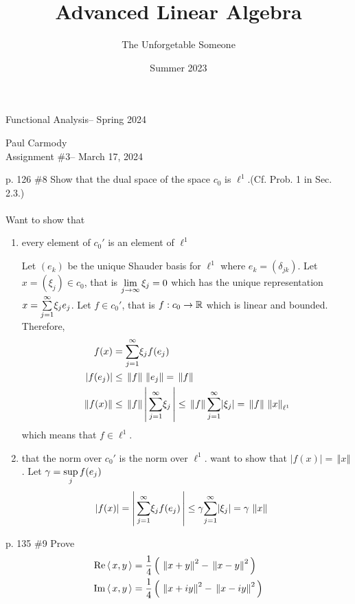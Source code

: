 \documentclass[10pt,a4paper]{report}
\title{Advanced Linear Algebra}
\author{The Unforgetable Someone}
\date{Summer 2023}
\newcommand{\CLASSNAME}{Functional Analysis}
\newcommand{\STUDENTNAME}{Paul Carmody}
\newcommand{\ASSIGNMENT}{Assignment \#3}
\newcommand{\DUEDATE}{March 17, 2024}
\newcommand{\SEMESTER}{Spring 2024}
\newcommand{\NORM}[1]{\,\left \Vert #1 \right \Vert}
\begin{document}
\begin{center}
	\Large{\CLASSNAME -- \SEMESTER} \\
\end{center}
\begin{center}
	\STUDENTNAME \\
	\ASSIGNMENT -- \DUEDATE\\
\end{center} 
p. 126 \#8 
Show that the dual space of the space $c_0$ is $\ell^1$.(Cf. Prob. 1 in Sec. 2.3.)\\
\\
Want to show that
\begin{enumerate}
	\item every element of $c_0'$ is an element of $\ell^1$
	
	Let $(e_k)$ be the unique Shauder basis for $\ell^1$ where $e_k = (\delta_{jk})$.  Let $x = (\xi_j) \in c_0$, that is $\underset{j\to \infty}\lim\, \xi_j = 0$ which has the unique representation $x=\underset{j=1}{\overset{\infty}{\sum}} \xi_j e_j$. Let $f \in c_0'$, that is $f: c_0 \to \mathbb{R}$ which is linear and bounded.  Therefore, 
	\begin{align*}
		f(x) &= \SUM{j=1}{\infty} \xi_j f(e_j)\\
		|f(e_j)| &\le \NORM{f}\NORM{e_j} = \NORM{f} \\
		\NORM{f(x)} &\le \NORM{f} \BARS{\SUM{j=1}{\infty} \xi_j} \le \NORM{f} \SUM{j=1}{\infty} |\xi_j| = \NORM{f} \NORM{x}_{\ell^1}
	\end{align*}which means that $f \in \ell^1$.
	
	\item that the norm over $c_0'$ is the norm over $\ell^1$.  want to show that $|f(x)| = \NORM{x}$.  Let $\gamma = \underset{j}\sup \, f(e_j)$
	\begin{align*}
		|f(x)| &= \BARS{\SUM{j=1}{\infty} \xi_j f(e_j)} \le \gamma \SUM{j=1}{\infty} |\xi_j| = \gamma \NORM{x}
	\end{align*}
\end{enumerate}

\noindent p. 135 \#9 Prove
\begin{align*}
	\RR \ABRACKET{x,y} &= \frac{1}{4}\PAREN{\NORM{x+y}^2-\NORM{x-y}^2} \\
	\IM \ABRACKET{x,y} &= \frac{1}{4}\PAREN{\NORM{x+iy}^2-\NORM{x-iy}^2} 
\end{align*}
\end{document}
